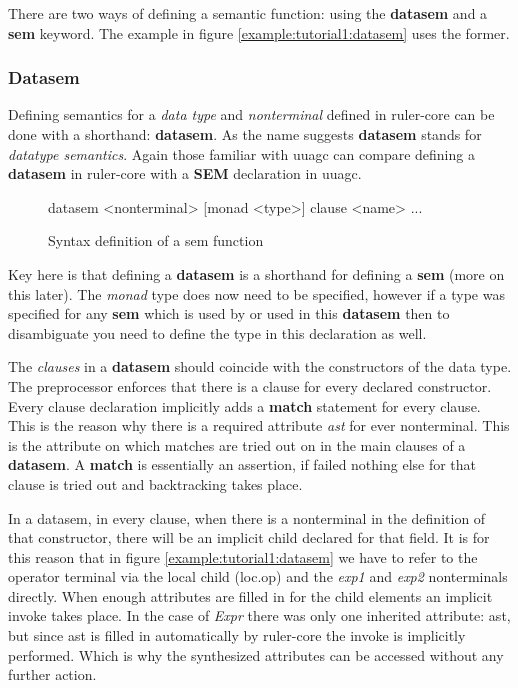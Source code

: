 There are two ways of defining a semantic function: using the \textbf{datasem} and a \textbf{sem} keyword. The example in figure \ref{example:tutorial1:datasem} uses the former.

\subsubsection{Datasem}
Defining semantics for a \emph{data type} and \emph{nonterminal} defined in ruler-core can be done with a shorthand: \textbf{datasem}. As the name suggests \textbf{datasem} stands for \emph{datatype semantics}. Again those familiar with uuagc can compare defining a \textbf{datasem} in ruler-core with a \textbf{SEM} declaration in uuagc.

\begin{figure}[!h]
\begin{code}
datasem <nonterminal> [monad <type>]
    {clause <name>
        ...
    }
\end{code}
\caption{Syntax definition of a sem function}
\label{datasem:syntax}
\end{figure}

Key here is that defining a \textbf{datasem} is a shorthand for defining a \textbf{sem} (more on this later). The \emph{monad} type does now need to be specified, however if a type was specified for any \textbf{sem} which is used by or used in this \textbf{datasem} then to disambiguate you need to define the type in this declaration as well.

The \emph{clauses} in a \textbf{datasem} should coincide with the constructors of the data type. The preprocessor enforces that there is a clause for every declared constructor. Every clause declaration implicitly adds a \textbf{match} statement for every clause. This is the reason why there is a required attribute \emph{ast} for ever nonterminal. This is the attribute on which matches are tried out on in the main clauses of a \textbf{datasem}. A \textbf{match} is essentially an assertion, if failed nothing else for that clause is tried out and backtracking takes place.

In a datasem, in every clause, when there is a nonterminal in the definition of that constructor, there will be an implicit child declared for that field. It is for this reason that in figure \ref{example:tutorial1:datasem} we have to refer to the operator terminal via the local child (loc.op) and the \emph{exp1} and \emph{exp2} nonterminals directly. When enough attributes are filled in for the child elements an implicit invoke takes place. In the case of \emph{Expr} there was only one inherited attribute: ast, but since ast is filled in automatically by ruler-core the invoke is implicitly performed. Which is why the synthesized attributes can be accessed without any further action. 

